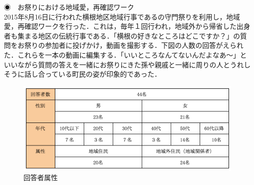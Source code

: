 \documentclass[a4paper]{jsarticle}
\begin{document}
\begin{itemize}


\subsubsubsection ◉　お祭りにおける地域愛，再確認ワーク\\
2015年8月16日に行われた横根地区地域行事であるの守門祭りを利用し，地域愛，再確認ワークを行った．これは，毎年１回行われ，地域外から帰省した出身者も集まる地区の伝統行事である．「横根の好きなところはどこですか？」の質問をお祭りの参加者に投げかけ，動画を撮影する．下図の人数の回答がえられた．これらを一本の動画に編集する．「いいところなんてないんだよなあ〜」といいながら質問の答えを一緒にお祭りにきた孫や親戚と一緒に周りの人とうれしそうに話し合っている町民の姿が印象的であった．

\begin{figure}[H]
  \begin{center}
    \includegraphics[width=0.8\hsize]{./images/21.png}
    \caption{回答者属性}
    \label{fig:tmu_hino}
  \end{center}
\end{figure}


\end{itemize}
\end{document}

